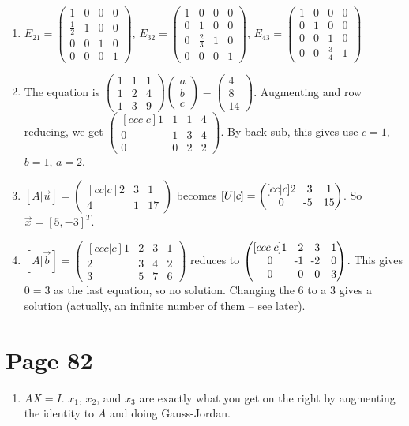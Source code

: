 \documentclass[11pt,twoside]{article}
\newcommand{\bpm}{\begin{pmatrix}}
\newcommand{\epm}{\end{pmatrix}}
\newcommand{\mn}{\llap{-}}
\begin{document}
\begin{enumerate}
  \item[14.] $E_{21} = \bpm 1 & 0 & 0 & 0 \\ \frac12 & 1 & 0 & 0 \\ 0 & 0 & 1 & 0 \\ 0 & 0 & 0 & 1\epm$, $E_{32} = \bpm 1 & 0 & 0 & 0 \\ 0 & 1 & 0 & 0 \\ 0 & \frac23 & 1 & 0 \\ 0 & 0 & 0 & 1\epm$, $E_{43} = \bpm 1 & 0 & 0 & 0 \\ 0 & 1 & 0 & 0 \\ 0 & 0 & 1 & 0 \\ 0 & 0 & \frac34 & 1\epm$
  
  \item[17.] The equation is $\bpm 1 & 1 & 1 \\ 1 & 2 & 4 \\ 1 & 3 & 9\epm \bpm a \\ b \\ c\epm = \bpm 4 \\ 8 \\ 14\epm$. Augmenting and row reducing, we get $\bpm[ccc|c] 1&1&1&4\\ 0 & 1 & 3 & 4 \\ 0 & 0 & 2 & 2\epm$. By back sub, this gives use $c=1$, $b=1$, $a=2$.
  
  \item[24.] $[A|\vec{u}] = \bpm[cc|c] 2 & 3 & 1 \\ 4 & 1 & 17\epm$ becomes $[U|\vec{c}]=\bpm[cc|c] 2 & 3 & 1 \\ 0 & \mn 5 & 15\epm$. So $\vec{x}=[5,-3]^T$.
  
  \item[25.] $[A|\vec{b}] = \bpm[ccc|c] 1 & 2 & 3 & 1 \\ 2 & 3 & 4 & 2 \\ 3 & 5 & 7 & 6\epm$ reduces to $\bpm[ccc|c] 1 & 2 & 3 & 1 \\ 0 & \mn1 & \mn2 & 0 \\ 0 & 0 & 0 & 3\epm$. This gives $0=3$ as the last equation, so no solution. Changing the 6 to a 3 gives a solution (actually, an infinite number of them -- see later).
  
\end{enumerate}

\section*{Page 82}
\begin{enumerate}
  \item[32.] $AX=I$. $x_1$, $x_2$, and $x_3$ are exactly what you get on the right by augmenting the identity to $A$ and doing Gauss-Jordan.
\end{enumerate}
\end{document}
